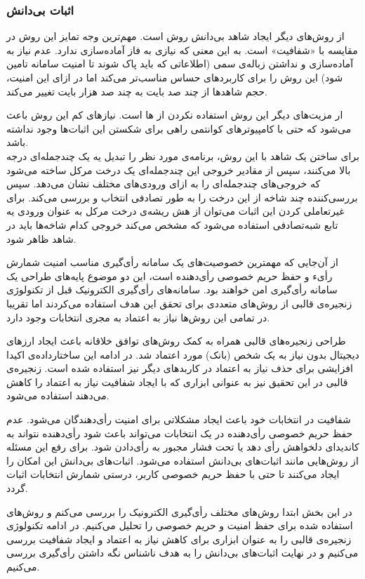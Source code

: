 \subsubsection{اثبات بی‌دانش }
از روش‌های دیگر ایجاد شاهد بی‌دانش روش 
\cite{zkstark}
است. مهم‌ترین وجه تمایز این روش در مقایسه با
 «شفافیت»
است. به این معنی که نیازی به فاز آماده‌سازی ندارد. عدم نیاز به آماده‌سازی و نداشتن زباله‌ی سمی (اطلاعاتی که باید پاک شوند تا امنیت سامانه تامین شود) این روش را برای کاربرد‌های حساس مناسب‌تر می‌کند اما در ازای این امنیت، حجم شاهد‌ها از چند صد بایت به چند صد هزار بایت تغییر می‌کند.
\par
ار مزیت‌های دیگر این روش استفاده نکردن از 
ها
است. نیاز‌های کم این روش باعث می‌شود که حتی با کامپیوتر‌های کوانتمی
 راهی برای شکستن این اثبات‌ها وجود نداشته باشد.
\\
برای ساختن یک شاهد با این روش، برنامه‌ی مورد نظر را تبدیل یه یک چندجمله‌ای درجه بالا می‌کنند، سپس از مقادیر خروجی این چندجمله‌ای یک درخت مرکل ساخته می‌شود که خروجی‌های چند‌جمله‌ای را به ازای ورودی‌های مختلف نشان می‌دهد. سپس بررسی‌کننده چند شاخه از این درخت را به طور تصادفی انتخاب و بررسی می‌کند. برای غیرتعاملی کردن این اثبات می‌توان از هش ریشه‌ی درخت مرکل به عنوان ورودی یه تابع شبه‌تصادفی
استفاده می‌شود که مشخص می‌کند خروجی کدام شاخه‌ها باید در شاهد ظاهر شود. 






از آن‌جایی که مهمترین خصوصیت‌های یک سامانه رأی‌گیری مناسب امنیت شمارش رأیء و حفظ حریم خصوصی رأی‌دهنده است، این دو موضوع پایه‌های طراحی یک سامانه رأی‌گیری امن خواهند بود. سامانه‌های رأی‌گیری الکترونیک قبل از تکنولوژی زنجیره‌ی قالبی از روش‌های متعددی برای تحقق این هدف استفاده می‌کردند اما تقریبا در تمامی این روش‌ها نیاز به اعتماد به مجری انتخابات وجود دارد. 
\par
طراحی زنجیره‌های قالبی همراه به کمک روش‌های توافق خلاقانه باعث ایجاد ارز‌های دیجیتال بدون نیاز به یک شخص (بانک) مورد اعتماد شد. در ادامه این ساختارداده‌ی اکیدا افزایشی برای حذف نیاز به اعتماد در کاربدهای دیگر نیز استفاده شده است. زنجیره‌ی قالبی در این تحقیق نیز به عنوانی ابزاری که با ایجاد شفافیت نیاز به اعتماد را کاهش می‌دهند استفاده می‌شود.
\par 
شفافیت در انتخابات خود باعث ایجاد مشکلاتی برای امنیت رأی‌دهندگان می‌شود. عدم حفظ حریم خصوصی رأی‌دهنده در یک انتخابات می‌تواند باعث شود رأی‌دهنده نتواند به کاندیدای دلخواهش رأی دهد یا تحت فشار مجبور به رأی‌دادن شود. برای رفع این مسئله از روش‌هایی مانند اثبات‌های بی‌دانش استفاده می‌شود. اثبات‌های بی‌دانش این امکان را ایجاد می‌کنند تا حتی با حفظ حریم خصوصی کاربر، درستی شمارش انتخابات اثبات گردد.
\par
در این بخش ابتدا روش‌های مختلف رأی‌گیری الکترونیک را بررسی می‌کنم و روش‌های استفاده شده برای حفظ امنیت و حریم خصوصی را تحلیل می‌کنیم. در ادامه تکنولوژی زنجیره‌ی قالبی را به عنوان ابزاری برای کاهش نیاز به اعتماد و ایجاد شفافیت بررسی می‌کنیم و در نهایت اثبات‌های بی‌دانش را به هدف ناشناس نگه‌ داشتن رأی‌گیری بررسی می‌کنیم.

